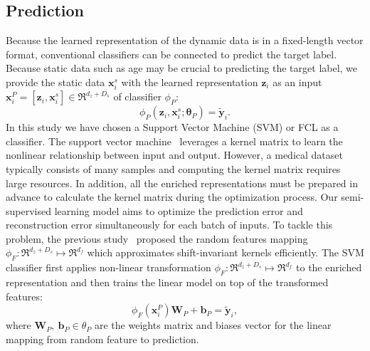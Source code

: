 \subsection{Prediction}
Because the learned representation of the dynamic data is in a fixed-length vector format, conventional classifiers can be connected to predict the target label. Because static data such as age may be crucial to predicting the target label, we provide the static data $\mathbf{x}_i^s$ with the learned representation $\mathbf{z}_i$ as an input $\mathbf{x}_i^P = [\mathbf{z}_i, \mathbf{x}_i^s] \in \Re^{d_z + D_s}$ of classifier $\phi_P$:
\begin{equation}
    \phi_P(\mathbf{z}_i, \mathbf{x}_i^s; \mathbf{\theta}_P) = \tilde{\mathbf{y}}_i.
\end{equation}
In this study we have chosen a Support Vector Machine (SVM) or FCL as a classifier. The support vector machine~\cite{vapnik1998support} leverages a kernel matrix to learn the nonlinear relationship between input and output. However, a medical dataset typically consists of many samples and computing the kernel matrix requires large resources. In addition, all the enriched representations must be prepared in advance to calculate the kernel matrix during the optimization process. Our semi-supervised learning model aims to optimize the prediction error and reconstruction error simultaneously for each batch of inputs. To tackle this problem, the previous study~\cite{rahimi2007random} proposed the random features mapping $\phi_F: \Re^{d_z + D_s} \mapsto \Re^{d_f}$ which approximates shift-invariant kernels efficiently. The SVM classifier first applies non-linear transformation $\phi_F: \Re^{d_z + D_s} \mapsto \Re^{d_f}$ to the enriched representation and then trains the linear model on top of the transformed features:
\begin{equation}
    \phi_F(\mathbf{x}_i^P) \mathbf{W}_{P} + \mathbf{b}_P = \tilde{\mathbf{y}}_i,
\end{equation}
where $\mathbf{W}_{P},\ \mathbf{b}_{P} \in \theta_P$ are the weights matrix and biases vector for the linear mapping from random feature to prediction.
